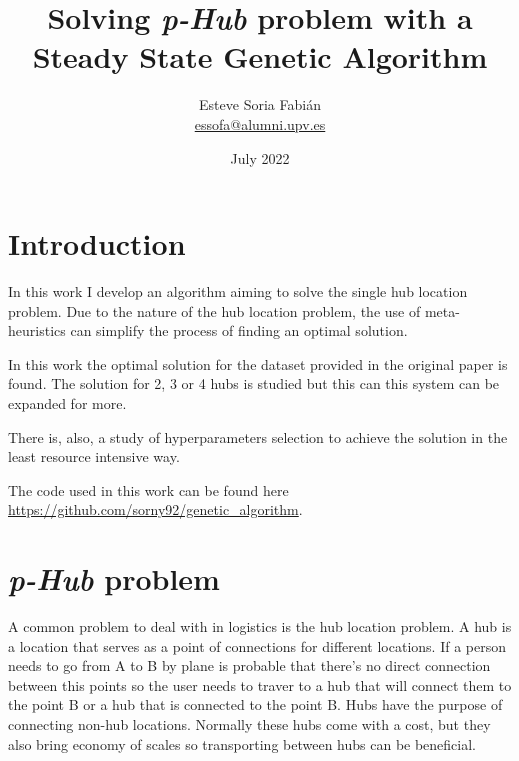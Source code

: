 \documentclass[12pt,oneside,a4paper]{article}
\title{Solving \textit{p-Hub} problem with a Steady State Genetic Algorithm}
\author{Esteve Soria Fabián \\ \href{mailto:essofa@alumni.upv.es}{essofa@alumni.upv.es}}
\date{July 2022}
\begin{document}
    \maketitle
    \newpage



    \section{Introduction}
    In this work I develop an algorithm aiming to solve the single hub location problem.
    Due to the nature of the hub location problem, the use of meta-heuristics can simplify the process of finding an
    optimal solution.

    In this work the optimal solution for the dataset provided in the original paper\cite{OKELLY1987393} is found.
    The solution for 2, 3 or 4 hubs is studied but this can this system can be expanded for more.

    There is, also, a study of hyperparameters selection to achieve the solution in the least resource intensive way.

    The code used in this work can be found here \url{https://github.com/sorny92/genetic_algorithm}.


    \section{\textit{p-Hub} problem}
    A common problem to deal with in logistics is the hub location problem.
    A hub is a location that serves as a point of connections for different locations.
    If a person needs to go from A to B by plane is probable that there's no direct connection between this
    points so the user needs to traver to a hub that will connect them to the point B or a hub that is connected to
    the point B.
    Hubs have the purpose of connecting non-hub locations.
    Normally these hubs come with a cost, but they also bring economy of scales so transporting between hubs can be
    beneficial.
\end{document}
